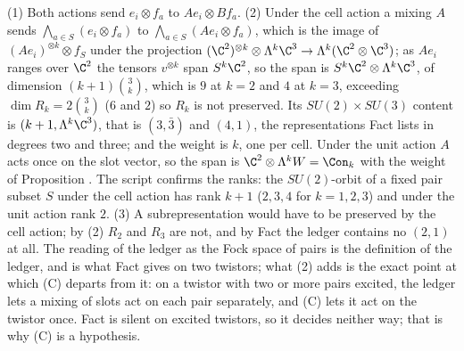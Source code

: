 (1) Both actions send $e_{i} \otimes f_{a}$ to $Ae_{i} \otimes Bf_{a}$. (2) Under the cell action a mixing $A$ sends $\bigwedge_{a \in S}(e_{i} \otimes f_{a})$ to $\bigwedge_{a \in S}(Ae_{i} \otimes f_{a})$, which is the image of $(Ae_{i})^{\otimes k} \otimes f_{S}$ under the projection $(\C^{2})^{\otimes k} \otimes \Lambda^{k}\C^{3} \to \Lambda^{k}(\C^{2} \otimes \C^{3})$; as $Ae_{i}$ ranges over $\C^{2}$ the tensors $v^{\otimes k}$ span $S^{k}\C^{2}$, so the span is $S^{k}\C^{2} \otimes \Lambda^{k}\C^{3}$, of dimension $(k+1)\binom{3}{k}$, which is $9$ at $k = 2$ and $4$ at $k = 3$, exceeding $\dim R_{k} = 2\binom{3}{k}$ ($6$ and $2$) so $R_{k}$ is not preserved. Its $SU(2) \times SU(3)$ content is $(k+1, \Lambda^{k}\C^{3})$, that is $(3,\bar{3})$ and $(4,1)$, the representations Fact  lists in degrees two and three; and the weight is $k$, one per cell. Under the unit action $A$ acts once on the slot vector, so the span is $\C^{2} \otimes \Lambda^{k}W = \Con_{k}$ with the weight of Proposition . The script confirms the ranks: the $SU(2)$-orbit of a fixed pair subset $S$ under the cell action has rank $k + 1$ ($2, 3, 4$ for $k = 1, 2, 3$) and under the unit action rank $2$. (3) A subrepresentation would have to be preserved by the cell action; by (2) $R_{2}$ and $R_{3}$ are not, and by Fact  the ledger contains no $(2,1)$ at all. The reading of the ledger as the Fock space of pairs is the definition of the ledger, and is what Fact  gives on two twistors; what (2) adds is the exact point at which (C) departs from it: on a twistor with two or more pairs excited, the ledger lets a mixing of slots act on each pair separately, and (C) lets it act on the twistor once. Fact  is silent on excited twistors, so it decides neither way; that is why (C) is a hypothesis.
